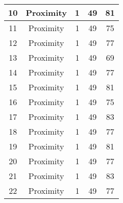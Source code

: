 \documentclass[results.tex]{subfiles}
\begin{document}
\begin{center}
\begin{tabular}{| c || c | c | c | c |}
            \hline
            10                      & Proximity                    & 1                      & 49                      & 81                   \\
            \hline
            11                      & Proximity                    & 1                      & 49                      & 75                   \\
            \hline
            12                      & Proximity                    & 1                      & 49                      & 77                   \\
            \hline
            13                      & Proximity                    & 1                      & 49                      & 69                   \\
            \hline
            14                      & Proximity                    & 1                      & 49                      & 77                   \\
            \hline
            15                      & Proximity                    & 1                      & 49                      & 81                   \\
            \hline
            16                      & Proximity                    & 1                      & 49                      & 75                   \\
            \hline
            17                      & Proximity                    & 1                      & 49                      & 83                   \\
            \hline
            18                      & Proximity                    & 1                      & 49                      & 77                   \\
            \hline
            19                      & Proximity                    & 1                      & 49                      & 81                   \\
            \hline
            20                      & Proximity                    & 1                      & 49                      & 77                   \\
            \hline
            21                      & Proximity                    & 1                      & 49                      & 83                   \\
            \hline
            22                      & Proximity                    & 1                      & 49                      & 77                   \\

\end{tabular}
\end{center}
\end{document}
